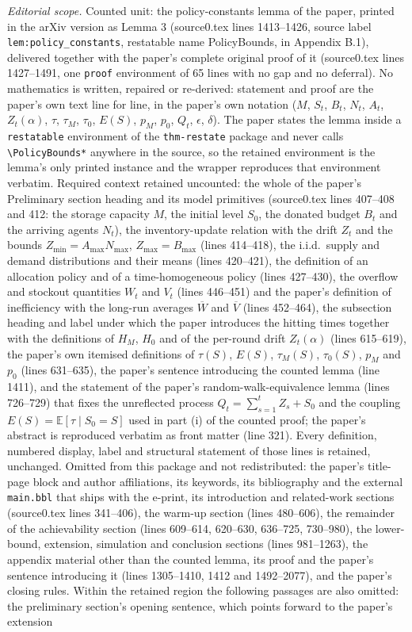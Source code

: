 \documentclass[10pt,a4paper]{amsart}
\theoremstyle{plain}
\theoremstyle{definition}
\theoremstyle{remark}
\newcommand{\E}{\mathbb{E}}
\newcommand{\Nmax}{N_{\max}}
\newcommand{\Bmax}{B_{\max}}
\newcommand{\maxAlloc}{A_{\max}}
\begin{document}
\noindent\textit{Editorial scope.} Counted unit: the policy-constants lemma of the paper, printed in the arXiv version as Lemma 3 (source0.tex lines 1413--1426, source label \texttt{lem:policy\_constants}, restatable name PolicyBounds, in Appendix B.1), delivered together with the paper's complete original proof of it (source0.tex lines 1427--1491, one \texttt{proof} environment of 65 lines with no gap and no deferral). No mathematics is written, repaired or re-derived: statement and proof are the paper's own text line for line, in the paper's own notation ($M$, $S_t$, $B_t$, $N_t$, $A_t$, $Z_t(\alpha)$, $\tau$, $\tau_M$, $\tau_0$, $E(S)$, $p_M$, $p_0$, $Q_t$, $\epsilon$, $\delta$). The paper states the lemma inside a \texttt{restatable} environment of the \texttt{thm-restate} package and never calls \texttt{\textbackslash PolicyBounds*} anywhere in the source, so the retained environment is the lemma's only printed instance and the wrapper reproduces that environment verbatim. Required context retained uncounted: the whole of the paper's Preliminary section heading and its model primitives (source0.tex lines 407--408 and 412: the storage capacity $M$, the initial level $S_0$, the donated budget $B_t$ and the arriving agents $N_t$), the inventory-update relation with the drift $Z_t$ and the bounds $Z_{\min}=\maxAlloc\Nmax$, $Z_{\max}=\Bmax$ (lines 414--418), the i.i.d.\ supply and demand distributions and their means (lines 420--421), the definition of an allocation policy and of a time-homogeneous policy (lines 427--430), the overflow and stockout quantities $W_t$ and $V_t$ (lines 446--451) and the paper's definition of inefficiency with the long-run averages $\overline{W}$ and $\overline{V}$ (lines 452--464), the subsection heading and label under which the paper introduces the hitting times together with the definitions of $H_M$, $H_0$ and of the per-round drift $Z_t(\alpha)$ (lines 615--619), the paper's own itemised definitions of $\tau(S)$, $E(S)$, $\tau_M(S)$, $\tau_0(S)$, $p_M$ and $p_0$ (lines 631--635), the paper's sentence introducing the counted lemma (line 1411), and the statement of the paper's random-walk-equivalence lemma (lines 726--729) that fixes the unreflected process $Q_t=\sum_{s=1}^t Z_s+S_0$ and the coupling $E(S)=\E[\tau\mid S_0=S]$ used in part (i) of the counted proof; the paper's abstract is reproduced verbatim as front matter (line 321). Every definition, numbered display, label and structural statement of those lines is retained, unchanged. Omitted from this package and not redistributed: the paper's title-page block and author affiliations, its keywords, its bibliography and the external \texttt{main.bbl} that ships with the e-print, its introduction and related-work sections (source0.tex lines 341--406), the warm-up section (lines 480--606), the remainder of the achievability section (lines 609--614, 620--630, 636--725, 730--980), the lower-bound, extension, simulation and conclusion sections (lines 981--1263), the appendix material other than the counted lemma, its proof and the paper's sentence introducing it (lines 1305--1410, 1412 and 1492--2077), and the paper's closing rules. Within the retained region the following passages are also omitted: the preliminary section's opening sentence, which points forward to the paper's extension 
\end{document}
